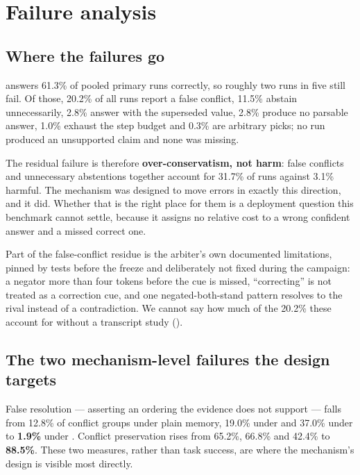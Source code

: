 \section{Failure analysis}
\label{sec:failure}



\subsection{Where the failures go}

 answers 61.3\% of pooled primary runs correctly, so roughly two runs in five still fail. Of those,
20.2\% of all runs report a false conflict, 11.5\% abstain unnecessarily, 2.8\% answer with the superseded value,
2.8\% produce no parsable answer, 1.0\% exhaust the step budget and 0.3\% are arbitrary picks; no run produced an
unsupported claim and none was missing.

The residual failure is therefore \textbf{over-conservatism, not harm}: false conflicts and unnecessary
abstentions together account for 31.7\% of runs against 3.1\% harmful. The mechanism was designed to move errors
in exactly this direction, and it did. Whether that is the right place for them is a deployment question this
benchmark cannot settle, because it assigns no relative cost to a wrong confident answer and a missed correct one.

Part of the false-conflict residue is the arbiter's own documented limitations, pinned by tests before the freeze
and deliberately not fixed during the campaign: a negator more than four tokens before the cue is missed,
``correcting'' is not treated as a correction cue, and one negated-both-stand pattern resolves to the rival instead
of a contradiction. We cannot say how much of the 20.2\% these account for without a transcript study
().

\subsection{The two mechanism-level failures the design targets}

False resolution --- asserting an ordering the evidence does not support --- falls from 12.8\% of conflict groups
under plain memory, 19.0\% under  and 37.0\% under  to \textbf{1.9\%} under . Conflict
preservation rises from 65.2\%, 66.8\% and 42.4\% to \textbf{88.5\%}. These two measures, rather than task
success, are where the mechanism's design is visible most directly.

